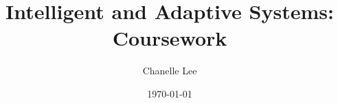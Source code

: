 \documentclass[11.5pt, twoside, a4paper]{article}
\begin{document}
\title{Intelligent and Adaptive Systems: Coursework}
\author{Chanelle Lee}
\date{\today}
\maketitle



%
\end{document}
